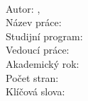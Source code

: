 \documentclass[main.tex]{subfiles}
\begin{document}
\newpage\null
\thispagestyle{empty}
\vfill
\noindent\large\textbf{}\\\normalsize
Autor: \@author, \@osobcislo\\
Název práce: \@title\\
Studijní program: \@stprogram\\
Vedoucí práce: \@supervisor\\
Akademický rok: \@schyear\\
Počet stran: \\
Klíčová slova:\\
\end{document}
